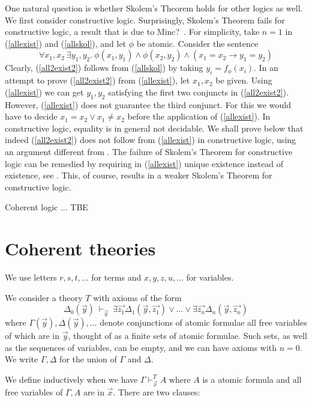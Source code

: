 \documentclass[10pt,a4paper]{article}
\begin{document}
One natural question is whether Skolem's Theorem holds for other logics as well.
We first consider constructive logic. Surprisingly, Skolem's Theorem fails
for constructive logic, a result that is due to Minc?~\cite{xxx}.
For simplicity, take $n=1$ in (\ref{allexist}) and (\ref{allskol}),
and let $\phi$ be atomic. Consider the sentence
\begin{equation}\label{all2exist2}
\forall x_1,x_2~\exists y_1,y_2.~\phi(x_1,y_1) \land \phi(x_2,y_2) \land (x_1 = x_2 \to y_1 = y_2)
\end{equation}
Clearly,  (\ref{all2exist2}) follows from (\ref{allskol}) by taking $y_i = f_\phi(x_i)$.
In an attempt to prove (\ref{all2exist2}) from (\ref{allexist}), let $x_1,x_2$ be given.
Using (\ref{allexist}) we can get $y_1,y_2$ satisfying the first two conjuncts
in (\ref{all2exist2}). However, (\ref{allexist}) does not guarantee the third conjunct.
For this we would have to decide $ x_1 = x_2 \lor x_1 \neq x_2$ before the
application of (\ref{allexist}). In constructive logic, equality is in general not decidable.
We shall prove below that indeed (\ref{all2exist2}) does not follow from  (\ref{allexist})
in constructive logic, using an argument different from \cite{xxx}.
The failure of Skolem's Theorem for constructive logic can be remedied by 
requiring in (\ref{allexist}) unique existence instead of existence, see \cite{xxx}.
This, of course, results in a weaker Skolem's Theorem for constructive logic.

Coherent logic ... TBE


\section{Coherent theories}\label{coherent}
 
We use letters $r,s,t,\dots$ for terms and $x,y,z,u,\dots$ for variables.

\medskip

 We consider a theory $T$ with axioms of the form
$$
\Delta_0(\vec{y})~\vdash_{\vec{y}}~
\exists \vec{z_1}\Delta_1(\vec{y},\vec{z_1})\vee\dots\vee\exists \vec{z_n}\Delta_n(\vec{y},\vec{z_n})
$$
where $\Gamma(\vec{y}), \Delta(\vec{y}),\dots$ denote conjunctions of atomic formulae
all free variables of which are in $\vec{y}$, thought of as a finite sets of atomic formulae.
Such sets, as well as the sequences of variables, can be empty, 
and we can have axioms with $n=0$. 
We write $\Gamma,\Delta$ for the union of $\Gamma$ and $\Delta$.

 We define inductively when we have $\Gamma\vdash_{\vec{x}}^T A$ where $A$ is a atomic formula
and all free variables of $\Gamma,A$ are in $\vec{x}$. There are two clauses:
\end{document}
